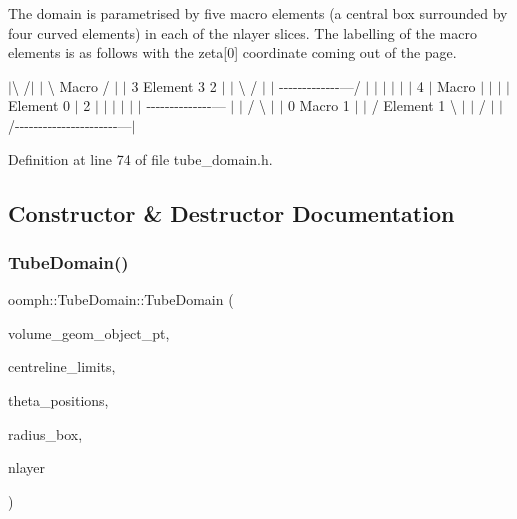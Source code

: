 The domain is parametrised by five macro elements (a central box surrounded by four curved elements) in each of the nlayer slices. The labelling of the macro elements is as follows with the zeta\mbox{[}0\mbox{]} coordinate coming out of the page. 

 $\vert$\textbackslash{} /$\vert$ $\vert$ \textbackslash{} Macro / $\vert$ $\vert$ 3 Element 3 2 $\vert$ $\vert$ \textbackslash{} / $\vert$ $\vert$ -\/-\/-\/-\/-\/-\/-\/-\/-\/-\/-\/-\/-\/---/ $\vert$ $\vert$ $\vert$ $\vert$ $\vert$ $\vert$ 4 $\vert$ Macro $\vert$ $\vert$ $\vert$ $\vert$ Element 0 $\vert$ 2 $\vert$ $\vert$ $\vert$ $\vert$ $\vert$ $\vert$ -\/-\/-\/-\/-\/-\/-\/-\/-\/-\/-\/-\/-\/-\/--- $\vert$ $\vert$ / \textbackslash{} $\vert$ $\vert$ 0 Macro 1 $\vert$ $\vert$ / Element 1 \textbackslash{} $\vert$ $\vert$ / $|$ $\vert$/-\/-\/-\/-\/-\/-\/-\/-\/-\/-\/-\/-\/-\/-\/-\/-\/-\/-\/-\/-\/-\/-\/---$\vert$ 

Definition at line 74 of file tube\+\_\+domain.\+h.



\subsection{Constructor \& Destructor Documentation}
\mbox{\label{classoomph_1_1TubeDomain_a025d462a0676026e5902d07ffbb3510e}} 
\subsubsection{\texorpdfstring{Tube\+Domain()}{TubeDomain()}\hspace{0.1cm}{\footnotesize\ttfamily [1/2]}}
{\footnotesize\ttfamily oomph\+::\+Tube\+Domain\+::\+Tube\+Domain (\begin{DoxyParamCaption}\item[{\hyperlink{classoomph_1_1GeomObject}{Geom\+Object} $\ast$}]{volume\+\_\+geom\+\_\+object\+\_\+pt,  }\item[{const \hyperlink{classoomph_1_1Vector}{Vector}$<$ double $>$ \&}]{centreline\+\_\+limits,  }\item[{const \hyperlink{classoomph_1_1Vector}{Vector}$<$ double $>$ \&}]{theta\+\_\+positions,  }\item[{const \hyperlink{classoomph_1_1Vector}{Vector}$<$ double $>$ \&}]{radius\+\_\+box,  }\item[{const unsigned \&}]{nlayer }\end{DoxyParamCaption})\hspace{0.3cm}{\ttfamily [inline]}}



